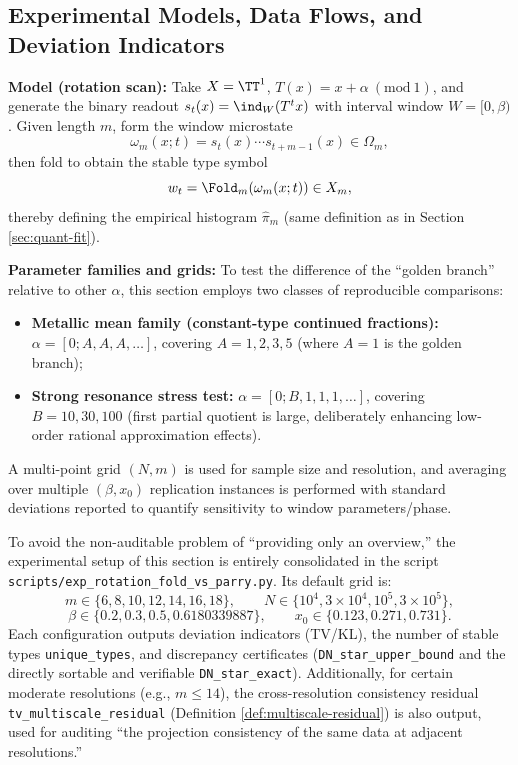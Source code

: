 \subsection{Experimental Models, Data Flows, and Deviation Indicators}

\textbf{Model (rotation scan):} Take $X=\TT^1$, $T(x)=x+\alpha\ (\mathrm{mod}\ 1)$, and generate the binary readout $s_t(x)=\ind_W(T^t x)$ with interval window $W=[0,\beta)$. Given length $m$, form the window microstate
\[
\omega_m(x;t)=s_t(x)\cdots s_{t+m-1}(x)\in\Omega_m,
\]
then fold to obtain the stable type symbol
\[
w_t=\Fold_m(\omega_m(x;t))\in X_m,
\]
thereby defining the empirical histogram $\hat{\pi}_m$ (same definition as in Section \ref{sec:quant-fit}).

\textbf{Parameter families and grids:} To test the difference of the ``golden branch'' relative to other $\alpha$, this section employs two classes of reproducible comparisons:
\begin{itemize}
  \item \textbf{Metallic mean family (constant-type continued fractions):} $\alpha=[0;A,A,A,\dots]$, covering $A=1,2,3,5$ (where $A=1$ is the golden branch);
  \item \textbf{Strong resonance stress test:} $\alpha=[0;B,1,1,1,\dots]$, covering $B=10,30,100$ (first partial quotient is large, deliberately enhancing low-order rational approximation effects).
\end{itemize}
A multi-point grid $(N,m)$ is used for sample size and resolution, and averaging over multiple $(\beta,x_0)$ replication instances is performed with standard deviations reported to quantify sensitivity to window parameters/phase.

\begin{remark}\label{rem:exp-script-spec}
To avoid the non-auditable problem of ``providing only an overview,'' the experimental setup of this section is entirely consolidated in the script \verb|scripts/exp_rotation_fold_vs_parry.py|. Its default grid is:
\[
m\in\{6,8,10,12,14,16,18\},\qquad
N\in\{10^4,3\times 10^4,10^5,3\times 10^5\},
\]
\[
\beta\in\{0.2,0.3,0.5,0.6180339887\},\qquad
x_0\in\{0.123,0.271,0.731\}.
\]
Each configuration outputs deviation indicators (TV/KL), the number of stable types \texttt{unique\_types}, and discrepancy certificates (\texttt{DN\_star\_upper\_bound} and the directly sortable and verifiable \texttt{DN\_star\_exact}). Additionally, for certain moderate resolutions (e.g., $m\le 14$), the cross-resolution consistency residual \texttt{tv\_multiscale\_residual} (Definition \ref{def:multiscale-residual}) is also output, used for auditing ``the projection consistency of the same data at adjacent resolutions.''
\end{remark}

